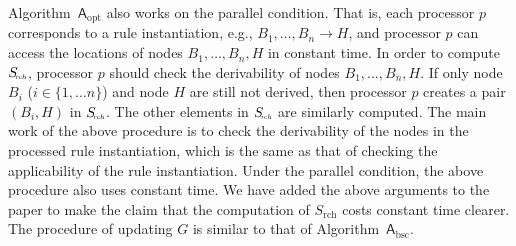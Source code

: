 \documentclass{article}
\begin{document}
Algorithm~$\mathsf{A}_{\text{opt}}$ also works on the parallel condition.
That is, each processor $p$ corresponds to a rule instantiation, e.g., $B_1,\ldots,B_n\rightarrow H$,
and processor $p$ can access the locations of nodes $B_1,\ldots,B_n, H$ in constant time.
In order to compute $S_{\!\textit{\tiny rch}}$, processor $p$ should check the derivability
of nodes $B_1,\ldots,B_n, H$. If only node $B_i$ ($i\in\{1,\ldots n\}$) and node $H$
are still not derived, then processor $p$ creates a pair $(B_i, H)$ in $S_{\!\textit{\tiny rch}}$.
The other elements in $S_{\!\textit{\tiny rch}}$ are similarly computed.
The main work of the above procedure is to check the derivability
of the nodes in the processed rule instantiation, which is the same as that of
checking the applicability of the rule instantiation.
Under the parallel condition, the above procedure also uses constant time.
We have added the above arguments to the paper to
make the claim that the computation of $S_\text{rch}$ costs
constant time clearer.
The procedure of updating $G$ is similar to that of Algorithm~$\mathsf{A}_{\text{bsc}}$.



\end{document}

